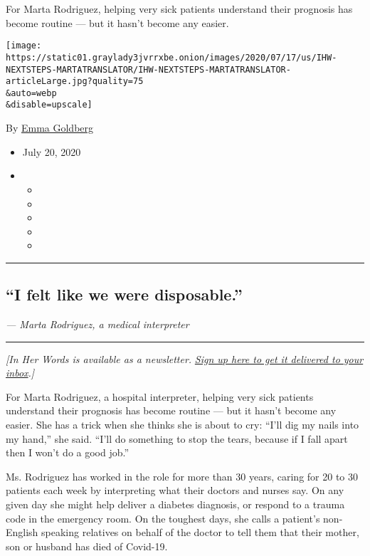 For Marta Rodriguez, helping very sick patients understand their
prognosis has become routine --- but it hasn't become any easier.

\texttt{[image: https://static01.graylady3jvrrxbe.onion/images/2020/07/17/us/IHW-NEXTSTEPS-MARTATRANSLATOR/IHW-NEXTSTEPS-MARTATRANSLATOR-articleLarge.jpg?quality=75\\\&auto=webp\\\&disable=upscale]}

By \href{https://www.nytimes3xbfgragh.onion/by/emma-goldberg}{Emma
Goldberg}

\begin{itemize}
\item
  July 20, 2020
\item
  \begin{itemize}
  \item
  \item
  \item
  \item
  \item
  \end{itemize}
\end{itemize}

\begin{center}\rule{0.5\linewidth}{\linethickness}\end{center}

\hypertarget{i-felt-like-we-were-disposable}{%
\subsection{``I felt like we were
disposable.''}\label{i-felt-like-we-were-disposable}}

\emph{--- Marta Rodriguez, a medical interpreter}

\begin{center}\rule{0.5\linewidth}{\linethickness}\end{center}

\emph{{[}In Her Words is available as a newsletter.}
\href{https://www.nytimes3xbfgragh.onion/newsletters/in-her-words}{\emph{Sign
up here to get it delivered to your inbox}}\emph{.{]}}

For Marta Rodriguez, a hospital interpreter, helping very sick patients
understand their prognosis has become routine --- but it hasn't become
any easier. She has a trick when she thinks she is about to cry: ``I'll
dig my nails into my hand,'' she said. ``I'll do something to stop the
tears, because if I fall apart then I won't do a good job.''

Ms. Rodriguez has worked in the role for more than 30 years, caring for
20 to 30 patients each week by interpreting what their doctors and
nurses say. On any given day she might help deliver a diabetes
diagnosis, or respond to a trauma code in the emergency room. On the
toughest days, she calls a patient's non-English speaking relatives on
behalf of the doctor to tell them that their mother, son or husband has
died of Covid-19.

